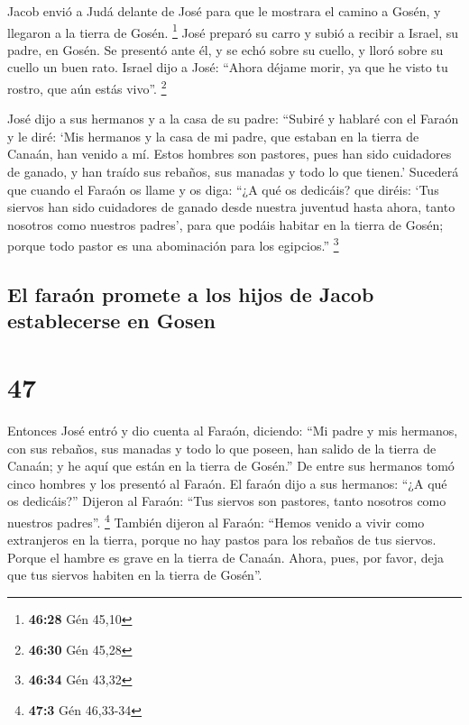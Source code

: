  Jacob envió a Judá delante de José para que le mostrara
el camino a Gosén, y llegaron a la tierra de Gosén. \footnote{\textbf{46:28}
  Gén 45,10}  José preparó su carro y subió a recibir a
Israel, su padre, en Gosén. Se presentó ante él, y se echó sobre su
cuello, y lloró sobre su cuello un buen rato.  Israel
dijo a José: ``Ahora déjame morir, ya que he visto tu rostro, que aún
estás vivo''. \footnote{\textbf{46:30} Gén 45,28}

 José dijo a sus hermanos y a la casa de su padre:
``Subiré y hablaré con el Faraón y le diré: `Mis hermanos y la casa de
mi padre, que estaban en la tierra de Canaán, han venido a mí.
 Estos hombres son pastores, pues han sido cuidadores de
ganado, y han traído sus rebaños, sus manadas y todo lo que tienen.'
 Sucederá que cuando el Faraón os llame y os diga: ``¿A
qué os dedicáis?  que diréis: `Tus siervos han sido
cuidadores de ganado desde nuestra juventud hasta ahora, tanto nosotros
como nuestros padres', para que podáis habitar en la tierra de Gosén;
porque todo pastor es una abominación para los egipcios.'' \footnote{\textbf{46:34}
  Gén 43,32}

\hypertarget{el-farauxf3n-promete-a-los-hijos-de-jacob-establecerse-en-gosen}{%
\subsection{El faraón promete a los hijos de Jacob establecerse en
Gosen}\label{el-farauxf3n-promete-a-los-hijos-de-jacob-establecerse-en-gosen}}

\hypertarget{section-46}{%
\section{47}\label{section-46}}

 Entonces José entró y dio cuenta al Faraón, diciendo:
``Mi padre y mis hermanos, con sus rebaños, sus manadas y todo lo que
poseen, han salido de la tierra de Canaán; y he aquí que están en la
tierra de Gosén.''  De entre sus hermanos tomó cinco
hombres y los presentó al Faraón.  El faraón dijo a sus
hermanos: ``¿A qué os dedicáis?'' Dijeron al Faraón: ``Tus siervos son
pastores, tanto nosotros como nuestros padres''. \footnote{\textbf{47:3}
  Gén 46,33-34}  También dijeron al Faraón: ``Hemos venido
a vivir como extranjeros en la tierra, porque no hay pastos para los
rebaños de tus siervos. Porque el hambre es grave en la tierra de
Canaán. Ahora, pues, por favor, deja que tus siervos habiten en la
tierra de Gosén''.

